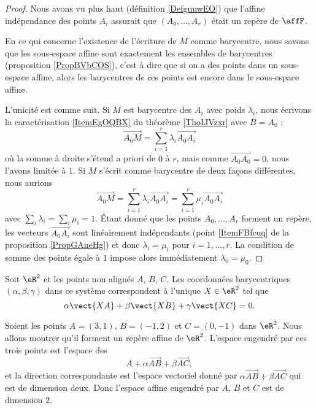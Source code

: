 \begin{proof}
    Nous avons vu plus haut (définition \ref{DefguuwEO}) que l'affine indépendance des points \( A_i\) assurait que \( (A_0,\ldots, A_r)\) était un repère de \( \affF\).

    En ce qui concerne l'existence de l'écriture de \( M\) comme barycentre, nous savons que les sous-espace affine sont exactement les ensembles de barycentres (proposition \ref{PropBVbCOS}), c'est à dire que si on a des points dans un sous-espace affine, alors les barycentres de ces points est encore dans le sous-espace affine.

    L'unicité est comme suit. Si \( M\) est barycentre des \( A_i\) avec poids \( \lambda_i\), nous écrivons la caractérisation \ref{ItemEgOQBX} du théorème \ref{ThoIJVzxr} avec \( B=A_0\) :
    \begin{equation}
        \overrightarrow{ A_0M }=\sum_{i=1}^r\lambda_i\overrightarrow{ A_0A_i }
    \end{equation}
    où la somme à droite s'étend a priori de \( 0\) à \( r\), mais comme \( \overrightarrow{ A_0A_0 }=0\), nous l'avons limitée à \( 1\). Si \( M\) s'écrit comme barycentre de deux façons différentes, nous aurions
    \begin{equation}
        \overrightarrow{ A_0M }=\sum_{i=1}^r\lambda_i\overrightarrow{ A_0A_i }=\sum_{i=1}^r\mu_i\overrightarrow{ A_0A_i }
    \end{equation}
    avec \( \sum_i\lambda_i=\sum_i\mu_i=1\). Étant donné que les points \( A_0,\ldots, A_r\) forment un repère, les vecteurs \( \overrightarrow{ A_0A_i }\) sont linéairement indépendants (point \ref{ItemFBfcuq} de la proposition \ref{PropGAneHg}) et donc \( \lambda_i=\mu_i\) pour \( i=1,\ldots, r\). La condition de somme des points égale à \( 1\) impose alors immédiatement \( \lambda_0=\mu_0\).
\end{proof}

\begin{normaltext}      \label{NORMooOGHBooMjmouu}
    Soit \( \eR^2\) et les points non alignés \( A\), \( B\), \( C\). Les coordonnées barycentriques \( (\alpha,\beta,\gamma)\) dans ce système correspondent à l'unique \( X\in \eR^2\) tel que
    \begin{equation}
        \alpha \vect{ XA }+\beta\vect{ XB }+\gamma\vect{ XC }=0.
    \end{equation}
\end{normaltext}

\begin{example}
    Soient les points \( A=(3,1)\), \( B=(-1,2)\) et \( C=(0,-1)\) dans \( \eR^2\). Nous allons montrer qu'il forment un repère affine de \( \eR^2\). L'espace engendré par ces trois points est l'espace des
    \begin{equation}
        A+\alpha\overrightarrow{ AB }+\beta\overrightarrow{ AC },
    \end{equation}
    et la direction correspondante est l'espace vectoriel donné par \( \alpha\overrightarrow{ AB }+\beta\overrightarrow{ AC }\) qui est de dimension deux. Donc l'espace affine engendré par \( A\), \( B\) et \( C\) est de dimension \( 2\).
\end{example}

